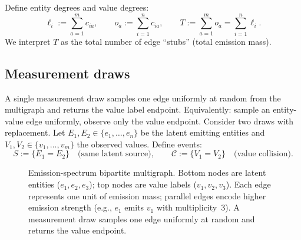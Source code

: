 \documentclass[11pt]{article}
\newcommand{\1}{\mathbf{1}}
\newcommand{\coll}{\mathcal{C}} %
\theoremstyle{plain}
\theoremstyle{definition}
\begin{document}
Define entity degrees and value degrees:
\[
\ell_i := \sum_{a=1}^m c_{ia},
\qquad
o_a := \sum_{i=1}^n c_{ia},
\qquad
T := \sum_{a=1}^m o_a = \sum_{i=1}^n \ell_i.
\]
We interpret $T$ as the total number of edge ``stubs'' (total emission mass).

\subsection{Measurement draws}
A single measurement draw samples one edge uniformly at random from the multigraph and returns the value label endpoint.
Equivalently: sample an entity-value edge uniformly, observe only the value endpoint.
Consider two draws with replacement.
Let $E_1,E_2\in\{e_1,\dots,e_n\}$ be the latent emitting entities and $V_1,V_2\in\{v_1,\dots,v_m\}$ the observed values.
Define events:
\[
S := \{E_1 = E_2\} \quad\text{(same latent source)},
\qquad
\coll := \{V_1 = V_2\} \quad\text{(value collision)}.
\]

\begin{figure}[htbp]
\centering
{}
\caption{Emission-spectrum bipartite multigraph.
Bottom nodes are latent entities ($e_1,e_2,e_3$); top nodes are value labels ($v_1,v_2,v_3$).
Each edge represents one unit of emission mass; parallel edges encode higher emission strength (e.g., $e_1$ emits $v_1$ with multiplicity~3).
A measurement draw samples one edge uniformly at random and returns the value endpoint.}
\label{fig:diagram}
\end{figure}
\end{document}
